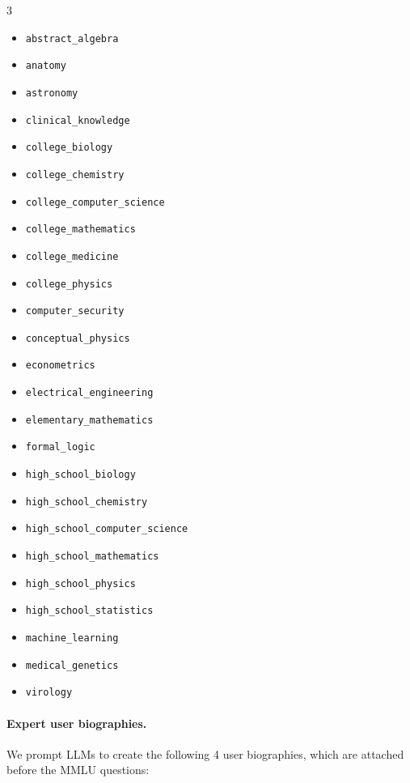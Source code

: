 \documentclass{article}
\theoremstyle{plain}
\theoremstyle{definition}
\theoremstyle{remark}
\begin{document}
\begin{multicols}{3}
\begin{itemize}[noitemsep, topsep=0pt]
    \small
    \item \texttt{abstract\_algebra}
    \item \texttt{anatomy}
    \item \texttt{astronomy}
    \item \texttt{clinical\_knowledge}
    \item \texttt{college\_biology}
    \item \texttt{college\_chemistry}
    \item \texttt{college\_computer\_science}
    \item \texttt{college\_mathematics}
    \item \texttt{college\_medicine}
    \item \texttt{college\_physics}
    \item \texttt{computer\_security}
    \item \texttt{conceptual\_physics}
    \item \texttt{econometrics}
    \item \texttt{electrical\_engineering}
    \item \texttt{elementary\_mathematics}
    \item \texttt{formal\_logic}
    \item \texttt{high\_school\_biology}
    \item \texttt{high\_school\_chemistry}
    \item \texttt{high\_school\_computer\_science}
    \item \texttt{high\_school\_mathematics}
    \item \texttt{high\_school\_physics}
    \item \texttt{high\_school\_statistics}
    \item \texttt{machine\_learning}
    \item \texttt{medical\_genetics}
    \item \texttt{virology}
\end{itemize}
\end{multicols}


\paragraph{Expert user biographies.} We prompt LLMs to create the following 4 user biographies, which are attached before the MMLU questions:
\end{document}
